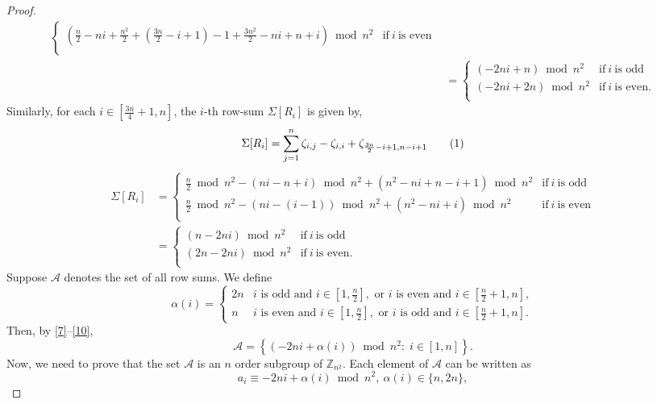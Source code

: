 \documentclass[preprint,11pt]{elsarticle}
\newcommand\numberthis{\addtocounter{equation}{1}\tag{\theequation}}
\begin{document}
\begin{proof}
\begin{align*}
\begin{cases}
    \left(\frac{n}{2}-ni+\frac{n^2}{2}+(\frac{3n}{2}-i+1) -1 +\frac{3n^2}{2}-ni+n+i\right)\bmod{n^2}  & \text{if}~ i ~ \text{is even}\\
    \end{cases}
    \\[6pt]
    &= \begin{cases}\left(-2ni+n\right)\bmod{n^2}  & \text{if}~ i ~ \text{is odd}\\
    \left(-2ni+2n\right)\bmod{n^2}  & \text{if}~ i ~ \text{is even}.\\
    \end{cases}
\end{align*}
Similarly, for each $i\in [\frac{3n}{4}+1, n]$, the $i$-th row-sum $\Sigma[R_i]$ is given by, 
\[\Sigma[R_i]=\sum_{j=1}^{n}\zeta_{i,j}- \zeta_{i, i} + \zeta_{\frac{3n}{2}-i+1,n-i+1 } \numberthis\label{10}\]
\begin{align*}
    \Sigma[R_i] &  = \begin{cases}\frac{n}{2}\bmod{n^2}-\left(ni-n+i\right)\bmod{n^2} +\left(n^2-ni+n-i+1\right)\bmod{n^2}  & \text{if}~ i ~ \text{is odd}\\
    \frac{n}{2}\bmod{n^2}-\left(ni-(i-1)\right)\bmod{n^2} +\left(n^2-ni+i\right)\bmod{n^2}  & \text{if}~ i ~ \text{is even}\\
    \end{cases}\\[6pt]
    &= \begin{cases}\left(n-2ni\right)\bmod{n^2}  & \text{if}~ i ~ \text{is odd}\\
    \left(2n-2ni\right)\bmod{n^2}  & \text{if}~ i ~ \text{is even}.\\
    \end{cases}
\end{align*} Suppose $\mathcal{A}$ denotes the set of all row sums. We define
\[
\alpha(i)=
\begin{cases}
2n & i\text{ is odd and } i\in \left[1,\frac n2\right],
       \text{ or }
       i\text{ is even and } i\in \left[\frac n2+1,n\right],\\[4pt]
n & i\text{ is even and } i\in \left[1,\frac n2\right],
      \text{ or }
      i\text{ is odd and } i\in \left[\frac n2+1,n\right].
\end{cases}
\]
Then, by \eqref{7}--\eqref{10},
\[
\mathcal{A}
=
\left\{
(-2ni+\alpha(i)) \bmod n^{2}
:\;
i\in[1,n]
\right\}.
\]
\noindent Now, we need to prove that the set $\mathcal{A}$ is an $n$ order subgroup of $\mathbb{Z}_{n^2}$. Each element of $\mathcal{A}$ can be written as 
\[
a_i \equiv -2ni + \alpha(i) \bmod{n^2}, ~ \alpha(i)\in\{n,2n\},
\]
\end{proof}
\end{document}
